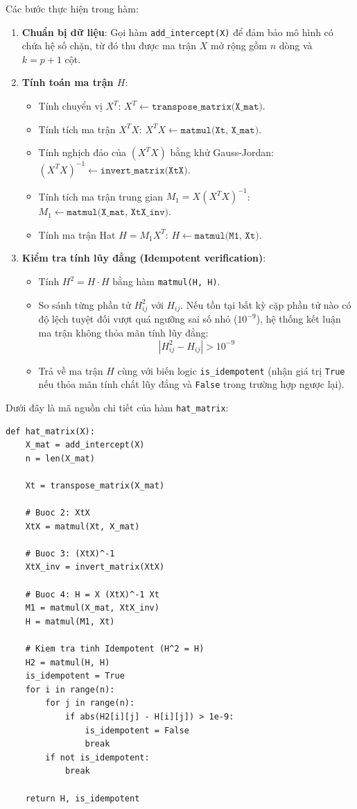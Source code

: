 Các bước thực hiện trong hàm:
\begin{enumerate}
    \item \textbf{Chuẩn bị dữ liệu}: Gọi hàm \texttt{add\_intercept(X)} để đảm bảo mô hình có chứa hệ số chặn, từ đó thu được ma trận $X$ mở rộng gồm $n$ dòng và $k = p+1$ cột.
    \item \textbf{Tính toán ma trận $H$}:
    \begin{itemize}
        \item Tính chuyển vị $X^T$: $X^T \leftarrow \texttt{transpose\_matrix(X\_mat)}$.
        \item Tính tích ma trận $X^T X$: $X^T X \leftarrow \texttt{matmul(Xt, X\_mat)}$.
        \item Tính nghịch đảo của $(X^T X)$ bằng khử Gauss-Jordan: $(X^T X)^{-1} \leftarrow \texttt{invert\_matrix(XtX)}$.
        \item Tính tích ma trận trung gian $M_1 = X(X^T X)^{-1}$: $M_1 \leftarrow \texttt{matmul(X\_mat, XtX\_inv)}$.
        \item Tính ma trận Hat $H = M_1 X^T$: $H \leftarrow \texttt{matmul(M1, Xt)}$.
    \end{itemize}
    \item \textbf{Kiểm tra tính lũy đẳng (Idempotent verification)}:
    \begin{itemize}
        \item Tính $H^2 = H \cdot H$ bằng hàm \texttt{matmul(H, H)}.
        \item So sánh từng phần tử $H^2_{ij}$ với $H_{ij}$. Nếu tồn tại bất kỳ cặp phần tử nào có độ lệch tuyệt đối vượt quá ngưỡng sai số nhỏ ($10^{-9}$), hệ thống kết luận ma trận không thỏa mãn tính lũy đẳng:
        \begin{equation}
            |H^2_{ij} - H_{ij}| > 10^{-9}
        \end{equation}
        \item Trả về ma trận $H$ cùng với biến logic \texttt{is\_idempotent} (nhận giá trị \texttt{True} nếu thỏa mãn tính chất lũy đẳng và \texttt{False} trong trường hợp ngược lại).
    \end{itemize}
\end{enumerate}
\newpage
Dưới đây là mã nguồn chi tiết của hàm \texttt{hat\_matrix}:

\begin{lstlisting}[style=Python]
def hat_matrix(X):
    X_mat = add_intercept(X)
    n = len(X_mat)

    Xt = transpose_matrix(X_mat)
    
    # Buoc 2: XtX
    XtX = matmul(Xt, X_mat)

    # Buoc 3: (XtX)^-1
    XtX_inv = invert_matrix(XtX)

    # Buoc 4: H = X (XtX)^-1 Xt
    M1 = matmul(X_mat, XtX_inv)
    H = matmul(M1, Xt)

    # Kiem tra tinh Idempotent (H^2 = H)
    H2 = matmul(H, H)
    is_idempotent = True
    for i in range(n):
        for j in range(n):
            if abs(H2[i][j] - H[i][j]) > 1e-9:
                is_idempotent = False
                break
        if not is_idempotent:
            break

    return H, is_idempotent
\end{lstlisting}

